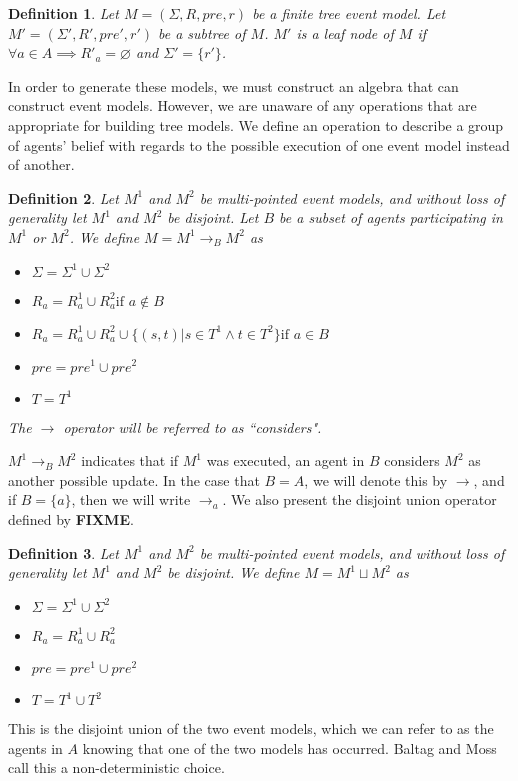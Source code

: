 \documentclass[12pt, a4paper, titlepage]{scrartcl}
\newtheorem{defn}{Definition}[subsection]
\numberwithin{equation}{section}
\newcommand{\FIXME}{{\bf FIXME}}
\begin{document}
\begin{defn} \label{leaf}
Let $M = (\Sigma, R, pre, r)$ be a finite tree event model.
Let $M' = (\Sigma', R', pre', r')$ be a subtree of $M$.
$M'$ is a leaf node of $M$ if $\forall a \in A \implies R'_a = \varnothing$ and $\Sigma' = \{ r'\}$.
\end{defn}

In order to generate these models, we must construct an algebra that can construct event models.
However, we are unaware of any operations that are appropriate for building tree models.
We define an operation to describe a group of agents' belief with regards to the possible execution
of one event model instead of another.

\begin{defn} \label{considers}
Let $M^1$ and $M^2$ be multi-pointed event models, and without loss of
generality let $M^1$ and $M^2$ be disjoint.
Let $B$ be a subset of agents participating in $M^1$ or $M^2$.
We define $M = M^1 \to_B M^2$ as 
\begin{itemize}
  \item $\Sigma = \Sigma^1 \cup \Sigma^2$
  \item $R_a = R^1_a \cup R^2_a \text{if } a \notin B$
	\item $R_a =
      R^1_a \cup
      R^2_a \cup
      \{(s,t) | s \in T^1 \land t \in T^2 \}
    \text{if } a \in B $
  \item $pre = pre^1 \cup pre^2$
  \item $T = T^1$
\end{itemize}
The $\to$ operator will be referred to as ``considers".
\end{defn}

$M^1 \to_B M^2$ indicates that if $M^1$ was executed, an agent in $B$ considers $M^2$ as another
possible update.
In the case that $B = A$, we will denote this by $\to$, and if $B = \{a\}$, then
we will write $\to_a$.
We also present the disjoint union operator defined by \FIXME.


\begin{defn} \label{disjoint}
Let $M^1$ and $M^2$ be multi-pointed event models, and without loss of generality let $M^1$ and
$M^2$ be disjoint.
We define $M = M^1 \sqcup M^2$ as
\begin{itemize}
	\item $\Sigma = \Sigma^1 \cup \Sigma^2$
	\item $R_a = R^1_a \cup R^2_a$
	\item $pre = pre^1 \cup pre^2$
	\item $T = T^1 \cup T^2$
\end{itemize}
\end{defn}
This is the disjoint union of the two event models, which we can refer to as the agents in $A$
knowing that one of the two models has occurred.
Baltag and Moss call this a non-deterministic choice.
\end{document}
